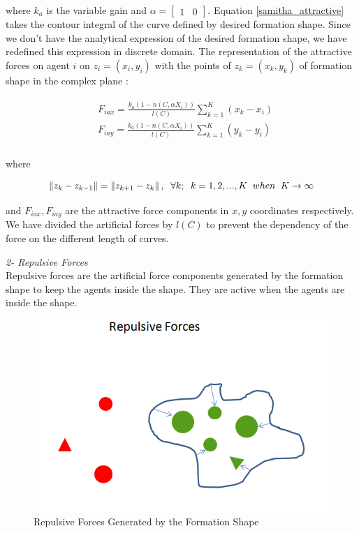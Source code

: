 where $k_a$ is the variable gain and $\alpha = \begin{bmatrix}
1 & 0
		\end{bmatrix}$. Equation \ref{samitha_attractive} takes the contour integral of the curve defined by desired formation shape. Since we don't have the analytical expression of the desired formation shape, we have redefined this expression in discrete domain. The representation of the attractive forces on agent $i$ on $z_i = (x_i, y_i)$ with the points of  $z_k = (x_k,y_k)$ of formation shape in the complex plane \cite{17}:

\begin{align}
\begin{split}
& F_{iax} =\frac{k_a (1-n(C,\alpha X_i))}{l(C)}  \sum_{k=1}^{K} (x_k  - x_i)\\
& F_{iay} =\frac{k_a (1-n(C,\alpha X_i))}{l(C)}  \sum_{k=1}^{K} (y_k  - y_i)\\
\end{split}
\end{align}
			
where

\begin{equation}
\left\lVert z_k - z_{k-1}\right\rVert = \left\lVert z_{k+1} - z_k\right\rVert, \hspace{0.2cm}  \forall k ;  \hspace{0.2cm} k=1,2,...,K \hspace{0.2cm} when  \hspace{0.2cm} K \to\infty
\end{equation}
			
and $F_{iax} , F_{iay} $ are the attractive force components in $x,y$ coordinates respectively. We have divided the artificial forces by $l(C)$ to prevent the dependency of the force on the different length of curves.
			
\textit{	2- Repulsive Forces} \\ 
Repulsive forces are the artificial force components generated by the formation shape to keep the agents inside the shape. They are active when the agents are inside the shape. 
					
\begin{figure}[H]
\caption{Repulsive Forces Generated by the Formation Shape}
\centering
\includegraphics[scale = 0.60]{repulsive_forces}
\end{figure}
							
